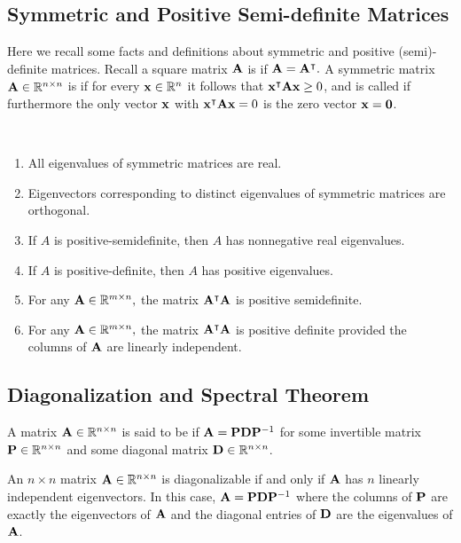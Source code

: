 \subsection{Symmetric and Positive Semi-definite Matrices}

Here we recall some facts and definitions about symmetric and positive (semi)-definite matrices. 
Recall a square matrix $\MA$ is  if $\MA = \MA^\intercal.$ 
A symmetric matrix $\MA \in \R^{n \times n}$ is  if for every $\vx \in \R^n$ it follows that $\vx^\intercal \MA \vx \geq 0$, and is called  if furthermore the only vector $\vx$ with $\vx^\intercal\MA\vx = 0$ is the zero vector $\vx =\vzero$.


\begin{theorem}\ 
\begin{enumerate}
    \item All eigenvalues of symmetric matrices are real. 
    \item Eigenvectors corresponding to distinct eigenvalues of symmetric matrices are orthogonal.
    \item If $A$ is positive-semidefinite, then $A$ has nonnegative real eigenvalues.
    \item If $A$ is positive-definite, then $A$ has positive eigenvalues.
    \item For any $\MA \in \R^{m \times n},$ the matrix $\MA^\intercal \MA$ is positive semidefinite. 
    \item For any $\MA \in \R^{m \times n},$ the matrix $\MA^\intercal \MA$ is positive definite provided the columns of $\MA$ are linearly independent. 
\end{enumerate}
\end{theorem}

\subsection{Diagonalization and Spectral Theorem}


A matrix $\MA \in \mathbb R^{n \times n}$ is said to be  if $\MA = \MP\MD\MP^{-1}$ for some invertible matrix $\MP \in \mathbb R^{n \times n}$ and some diagonal matrix $\MD \in \mathbb R^{n \times n}$. 


\begin{theorem}
An $n \times n$ matrix $\MA \in \mathbb R^{n \times n}$ is diagonalizable if and only if $\MA$ has $n$ linearly independent eigenvectors. In this case, 
$\MA = \MP\MD\MP^{-1}$
where the columns of $\MP$ are exactly the eigenvectors of $\MA$ and the diagonal entries of $\MD$ are the eigenvalues of $\MA$. 
\end{theorem}

